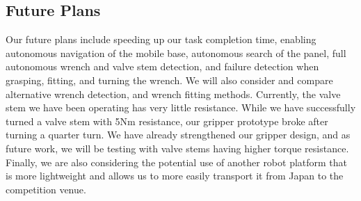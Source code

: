 \documentclass{standalone}
\begin{document}
\subsection{Future Plans}
Our future plans include speeding up our task completion time, enabling autonomous navigation of the mobile base, autonomous search of the panel, full autonomous wrench and valve stem detection, and failure detection when grasping, fitting, and turning the wrench. We will also consider and compare alternative wrench detection, and wrench fitting methods. Currently, the valve stem we have been operating has very little resistance. While we have successfully turned a valve stem with 5Nm resistance, our gripper prototype broke after turning a quarter turn. We have already strengthened our gripper design, and as future work, we will be testing with valve stems having higher torque resistance.  Finally, we are also considering the potential use of another robot platform that is more lightweight and allows us to more easily transport it from Japan to the competition venue. 
\end{document}
